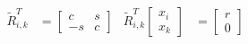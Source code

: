 \begin{multicols}{4}
\begin{align*}
	\tilde{R}_{i,k}^T &= \begin{bmatrix}
		c & s \\
		-s & c
	\end{bmatrix} &
	\tilde{R}_{i,k}^T \begin{bmatrix}
		x_i \\ x_k
	\end{bmatrix}
	&=
	\begin{bmatrix}
		r \\ 0
	\end{bmatrix}
\end{align*}
\end{multicols}
